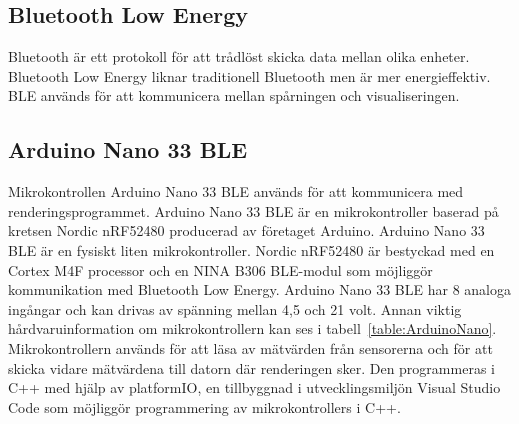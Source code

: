 \documentclass[a4paper]{article}
\makeatletter
\let\\\@raggedtwoe@savedcr%
\makeatother
\begin{document}
\begin{sloppypar}
    \subsection{Bluetooth Low Energy}
    Bluetooth är ett protokoll för att trådlöst skicka data mellan olika enheter. Bluetooth Low Energy liknar traditionell Bluetooth men är mer energieffektiv.~\cite{Bluetooth}
    BLE används för att kommunicera mellan spårningen och visualiseringen.

    \subsection{Arduino Nano 33 BLE}

    Mikrokontrollen Arduino Nano 33 BLE används för att kommunicera med renderingsprogrammet.
    Arduino Nano 33 BLE är en mikrokontroller baserad på kretsen Nordic nRF52480 producerad av företaget Arduino.
    Arduino Nano 33 BLE är en fysiskt liten mikrokontroller. Nordic nRF52480 är bestyckad med en Cortex M4F processor
    och en NINA B306 BLE-modul som möjliggör kommunikation med Bluetooth Low Energy. Arduino Nano 33 BLE har 8 analoga
    ingångar och kan drivas av spänning mellan 4,5 och 21 volt. Annan viktig hårdvaruinformation om mikrokontrollern
    kan ses i tabell~\ref{table:ArduinoNano}. ~\cite{Arduino:ABX00030}
    \\\\
    Mikrokontrollern används för att läsa av mätvärden från sensorerna och för att skicka vidare mätvärdena till
    datorn där renderingen sker. Den programmeras i C++ med hjälp av platformIO, en tillbyggnad i utvecklingsmiljön
    Visual Studio Code som möjliggör programmering av mikrokontrollers i C++.


\end{sloppypar}
\end{document}

